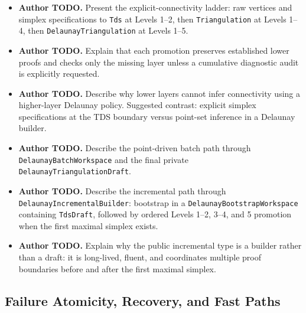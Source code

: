 \documentclass[manuscript,nonacm]{acmart}
\newcommand{\AuthorTodo}[1]{\textbf{Author TODO.} #1}
\begin{document}
\begin{itemize}
    \raggedright
  \item \AuthorTodo{Present the explicit-connectivity ladder: raw vertices and
      simplex specifications to \texttt{Tds} at Levels 1--2, then
      \texttt{Triangulation} at Levels 1--4, then
    \texttt{DelaunayTriangulation} at Levels 1--5.}
  \item \AuthorTodo{Explain that each promotion preserves established lower
      proofs and checks only the missing layer unless a cumulative diagnostic
    audit is explicitly requested.}
  \item \AuthorTodo{Describe why lower layers cannot infer connectivity using
      a higher-layer Delaunay policy. Suggested contrast: explicit simplex
      specifications at the TDS boundary versus point-set inference in a
    Delaunay builder.}
  \item \AuthorTodo{Describe the point-driven batch path through
      \texttt{DelaunayBatch}\hspace{0pt}\texttt{Workspace} and the final
      private
    \texttt{DelaunayTriangulation}\hspace{0pt}\texttt{Draft}.}
  \item \AuthorTodo{Describe the incremental path through
      \texttt{DelaunayIncremental}\hspace{0pt}\texttt{Builder}: bootstrap in a
      \texttt{DelaunayBootstrap}\hspace{0pt}\texttt{Workspace} containing
      \texttt{TdsDraft}, followed
      by ordered Levels 1--2, 3--4, and 5 promotion when the first
      maximal simplex
    exists.}
  \item \AuthorTodo{Explain why the public incremental type is a builder rather
      than a draft: it is long-lived, fluent, and coordinates multiple proof
    boundaries before and after the first maximal simplex.}
\end{itemize}

\subsection{Failure Atomicity, Recovery, and Fast Paths}
\end{document}
